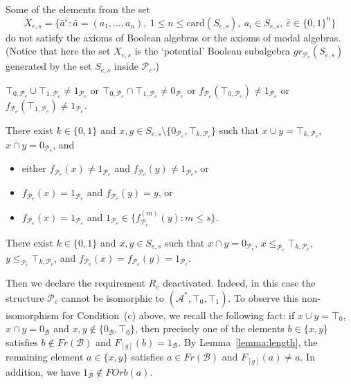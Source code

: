 \documentclass[a4paper,UKenglish,cleveref, autoref, thm-restate]{lipics-v2021}
\begin{document}
\begin{alphaenumerate}
	\item Some of the elements from the set 
	\[
		X_{e,s} = \big\{ \bar a^{\bar \varepsilon} : \bar a = (a_1,\dots,a_n),\ 1\leq n \leq \mathrm{card}(S_{e,s}),\ a_i \in S_{e,s},\ \bar\varepsilon \in \{0,1\}^n
		\big\}
	\] 
	do not satisfy the axioms of Boolean algebras or the axioms of modal algebras. (Notice that here the set $X_{e,s}$ is the `potential' Boolean subalgebra $gr_{\mathcal{P}_e}(S_{e,s})$ generated by the set $S_{e,s}$ inside $\mathcal{P}_e$.)
	
	\item $\top_{0,\mathcal{P}_e} \cup \top_{1,\mathcal{P}_e} \neq 1_{\mathcal{P}_e}$ or $\top_{0,\mathcal{P}_e} \cap \top_{1,\mathcal{P}_e} \neq 0_{\mathcal{P}_e}$ or $f_{\mathcal{P}_e}(\top_{0,\mathcal{P}_e}) \neq 1_{\mathcal{P}_e}$ or $f_{\mathcal{P}_e}(\top_{1,\mathcal{P}_e}) \neq 1_{\mathcal{P}_e}$.
	
	\item There exist $k\in\{ 0,1\}$ and $x,y\in S_{e,s} \setminus\{ 0_{\mathcal{P}_e}, \top_{k,\mathcal{P}_e}\}$ such that $x\cup y = \top_{k,\mathcal{P}_e}$, $x\cap y = 0_{\mathcal{P}_e}$, and 
	\begin{itemize}
		\item either $f_{\mathcal{P}_e}(x) \neq 1_{\mathcal{P}_e}$ and $f_{\mathcal{P}_e}(y)\neq 1_{\mathcal{P}_e}$, or
		
		\item $f_{\mathcal{P}_e}(x) = 1_{\mathcal{P}_e}$ and $f_{\mathcal{P}_e}(y) = y$, or
		
		\item $f_{\mathcal{P}_e}(x) = 1_{\mathcal{P}_e}$ and $1_{\mathcal{P}_e} \in  \{ f^{(m)}_{\mathcal{P}_e}(y) : m\leq s \}$.
	\end{itemize}
	
	\item There exist $k\in\{ 0,1\}$ and $x,y \in S_{e,s}$ such that $x\cap y = 0_{\mathcal{P}_e}$, $x\leq_{\mathcal{P}_e}\! \top_{k,\mathcal{P}_e}$, $y\leq_{\mathcal{P}_e}\! \top_{k,\mathcal{P}_e}$, and $f_{\mathcal{P}_e}(x) = f_{\mathcal{P}_e}(y) = 1_{\mathcal{P}_e}$.
\end{alphaenumerate}

Then we declare the requirement $R_e$ deactivated. 
Indeed, in this case the structure $\mathcal{P}_e$ cannot be isomorphic to $(\mathcal{A}^{\ast}, \top_0,\top_1)$. To observe this non-isomorphism for Condition~(c) above, we recall the following fact: if $x\cup y = \top_0$, $x\cap y = 0_{\mathcal{B}}$ and $x,y\not\in \{ 0_{\mathcal{B}}, \top_{0}\}$, then precisely one of the elements $b\in \{x,y\}$ satisfies $b\not\in Fr(\mathcal{B})$ and $F_{[g]}(b) = 1_{\mathcal{B}}$. By Lemma~\ref{lemma:length}, the remaining element $a \in \{ x,y\}$ satisfies $a\in Fr(\mathcal{B})$ and $F_{[g]}(a) \neq a$. In addition, we have $1_{\mathcal{B}} \not\in FOrb(a)$.
\end{document}
